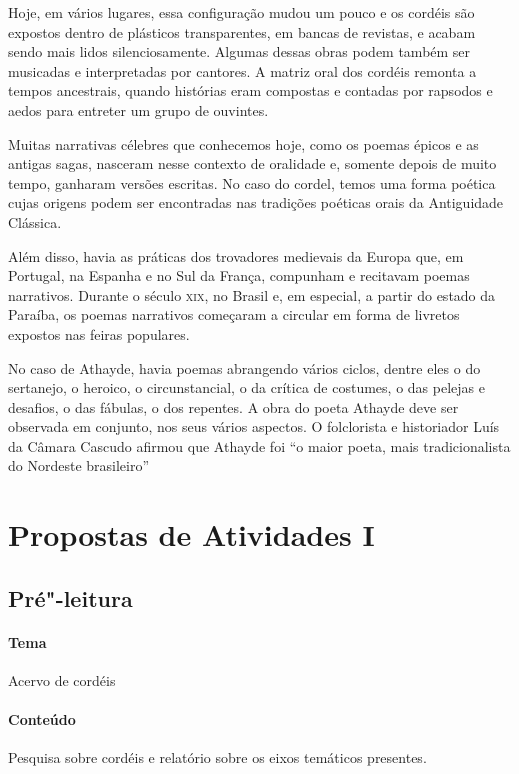 \documentclass[12pt]{extarticle}
\begin{document}
Hoje, em vários lugares, essa configuração mudou um pouco e os cordéis são
expostos dentro de plásticos transparentes, em bancas de revistas, e acabam
sendo mais lidos silenciosamente. Algumas dessas obras podem também ser
musicadas e interpretadas por cantores. A matriz oral dos cordéis remonta
a tempos ancestrais, quando histórias eram compostas e contadas por rapsodos
e aedos para entreter um grupo de ouvintes.

Muitas narrativas célebres que conhecemos hoje, como os poemas épicos e as
antigas sagas, nasceram nesse contexto de oralidade e, somente depois de muito
tempo, ganharam versões escritas. No caso do cordel, temos uma forma poética
cujas origens podem ser encontradas nas tradições poéticas orais da Antiguidade
Clássica.

Além disso, havia as práticas dos trovadores medievais da Europa que, em
Portugal, na Espanha e no Sul da França, compunham e recitavam poemas
narrativos. Durante o século \textsc{xix}, no Brasil e, em especial, a partir
do estado da Paraíba, os poemas narrativos começaram a circular em forma de
livretos expostos nas feiras populares.

No caso de Athayde, havia poemas abrangendo vários ciclos, dentre eles o do
sertanejo, o heroico, o circunstancial, o da crítica de costumes, o das pelejas
e desafios, o das fábulas, o dos repentes. A obra do poeta Athayde deve ser
observada em conjunto, nos seus vários aspectos. O folclorista e historiador
Luís da Câmara Cascudo afirmou que Athayde foi ``o maior poeta, mais
tradicionalista do Nordeste brasileiro''

\section{Propostas de Atividades I}

\subsection{Pré"-leitura}

\paragraph{Tema} Acervo de cordéis

\paragraph{Conteúdo} Pesquisa sobre cordéis e relatório sobre os eixos
temáticos presentes.
\end{document}
